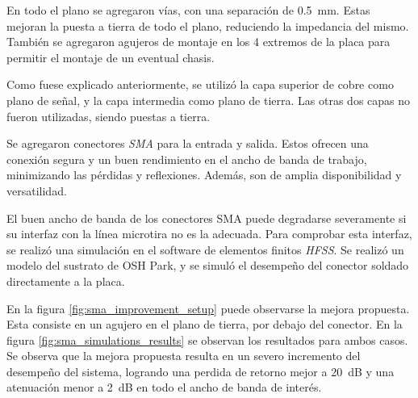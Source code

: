 En todo el plano se agregaron vías, con una separación de
\qty{0.5}{\milli\meter}. Estas mejoran la puesta a tierra de todo el plano,
reduciendo la impedancia del mismo. También se agregaron agujeros de montaje en
los 4 extremos de la placa para permitir el montaje de un eventual chasis.

Como fuese explicado anteriormente, se utilizó la capa superior de cobre como
plano de señal, y la capa intermedia como plano de tierra. Las otras dos capas
no fueron utilizadas, siendo puestas a tierra.

Se agregaron conectores \textit{SMA} para la entrada y salida. Estos ofrecen
una conexión segura y un buen rendimiento en el ancho de banda de trabajo,
minimizando las pérdidas y reflexiones. Además, son de amplia disponibilidad y
versatilidad.

El buen ancho de banda de los conectores SMA puede degradarse severamente si su
interfaz con la línea microtira no es la adecuada. Para comprobar esta interfaz,
se realizó una simulación en el software de elementos finitos \textit{HFSS}. Se
realizó un modelo del sustrato de OSH Park, y se simuló el desempeño del conector
soldado directamente a la placa.

En la figura \ref{fig:sma_improvement_setup} puede observarse la mejora
propuesta. Esta consiste en un agujero en el plano de tierra, por debajo del
conector. En la figura \ref{fig:sma_simulations_results} se observan los
resultados para ambos casos. Se observa que la mejora propuesta resulta en un
severo incremento del desempeño del sistema, logrando una perdida de retorno
mejor a \qty{20}{\dB} y una atenuación menor a \qty{2}{\dB} en todo el ancho de
banda de interés.

